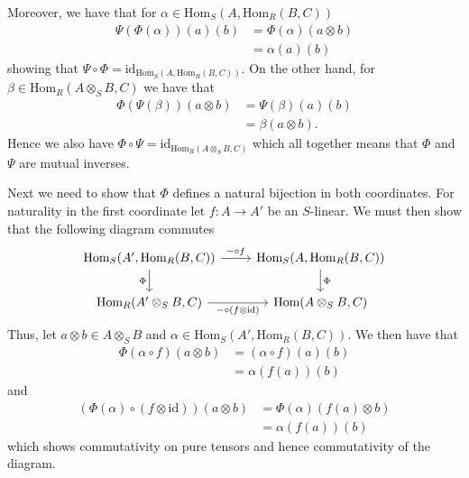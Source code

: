\documentclass[a4paper]{article}
\begin{document}
\begin{exercise}{5}
  Moreover, we have that for $ \alpha \in \text{Hom}_S(A, \text{Hom}_R(B,C)) $
  \begin{align*}
    \Psi(\Phi(\alpha))(a)(b) &= \Phi(\alpha)(a \otimes b) \\
                             &= \alpha(a)(b)
  \end{align*}
  showing that $ \Psi \circ \Phi = \text{id}_{\text{Hom}_S(A, \text{Hom}_R(B,C))} $. On the other hand, for $ \beta \in \text{Hom}_R(A \otimes_S B, C) $ we have that
  \begin{align*}
    \Phi(\Psi(\beta))(a \otimes b) &= \Psi(\beta)(a)(b) \\
                                   &= \beta(a \otimes b).
  \end{align*}
  Hence we also have $ \Phi \circ \Psi = \text{id}_{\text{Hom}_R(A\otimes_{S}B, C)} $ which all together means that $ \Phi $ and $ \Psi $ are mutual inverses.

  Next we need to show that $ \Phi $ defines a natural bijection in both coordinates. For naturality in the first coordinate let $ f: A \to A' $ be an $ S $-linear. We must then show that the following diagram commutes
  \[\begin{tikzcd}
	  {\text{Hom}_S(A', \text{Hom}_R(B,C))} & {\text{Hom}_S(A, \text{Hom}_R(B,C))} \\
	  {\text{Hom}_R(A'\otimes_S B, C)} & {\text{Hom}(A \otimes_S B, C)}
	  \arrow["{-\circ f}", from=1-1, to=1-2]
	  \arrow["\Phi"', from=1-1, to=2-1]
	  \arrow["\Phi", from=1-2, to=2-2]
	  \arrow["{-\circ (f\otimes\text{id})}"', from=2-1, to=2-2]
  \end{tikzcd}\]
  Thus, let $ a \otimes b \in A \otimes_S B $ and $ \alpha \in \text{Hom}_S(A', \text{Hom}_R(B,C)) $. We then have that
  \begin{align*}
    \Phi(\alpha\circ f)(a \otimes b) &= (\alpha\circ f)(a)(b) \\
                                     &= \alpha(f(a))(b)
  \end{align*}
  and
  \begin{align*}
    (\Phi(\alpha)\circ (f \otimes \text{id}))(a \otimes b) &= \Phi(\alpha)(f(a) \otimes b) \\
                                                           &= \alpha(f(a))(b)
  \end{align*}
  which shows commutativity on pure tensors and hence commutativity of the diagram.


\end{exercise}
\end{document}
